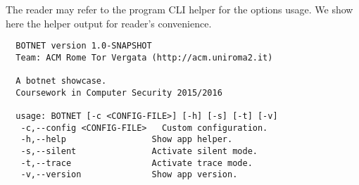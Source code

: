The reader may refer to the program CLI helper for the options usage. We show here the helper output for reader's convenience.

\begin{verbatim}
  BOTNET version 1.0-SNAPSHOT
  Team: ACM Rome Tor Vergata (http://acm.uniroma2.it)

  A botnet showcase.
  Coursework in Computer Security 2015/2016

  usage: BOTNET [-c <CONFIG-FILE>] [-h] [-s] [-t] [-v]
   -c,--config <CONFIG-FILE>   Custom configuration.
   -h,--help                 Show app helper.
   -s,--silent               Activate silent mode.
   -t,--trace                Activate trace mode.
   -v,--version              Show app version.
\end{verbatim}
